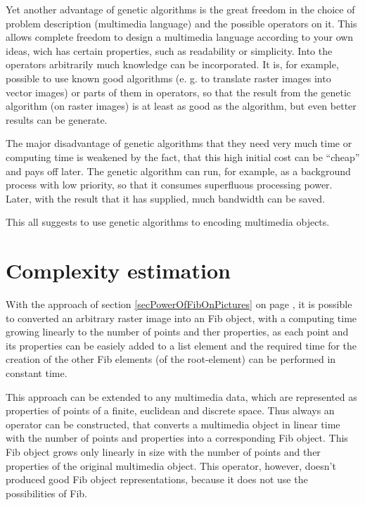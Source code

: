 Yet another advantage of genetic algorithms is the great freedom in the choice of problem description (multimedia language) and the possible operators on it. This allows complete freedom to design a multimedia language according to your own ideas, wich has certain properties, such as readability or simplicity. Into the operators arbitrarily much knowledge can be incorporated. It is, for example, possible to use known good algorithms (e. g. to translate raster images into vector images) or parts of them in operators, so that the result from the genetic algorithm (on raster images) is at least as good as the algorithm, but even better results can be generate.

The major disadvantage of genetic algorithms that they need very much time or computing time is weakened by the fact, that this high initial cost can be ``cheap'' and pays off later. The genetic algorithm can run, for example, as a background process with low priority, so that it consumes superfluous processing power. Later, with the result that it has supplied, much bandwidth can be saved.

This all suggests to use genetic algorithms to encoding multimedia objects.


\section{Complexity estimation}
\label{abschaet}

With the approach of section \ref{secPowerOfFibOnPictures} on page \pageref{secPowerOfFibOnPictures}, it is possible to converted an arbitrary raster image into an Fib object, with a computing time growing linearly to the number of points and ther properties, as each point and its properties can be easiely added to a list element and the required time for the creation of the other Fib elements (of the root-element) can be performed in constant time.

This approach can be extended to any multimedia data, which are represented as properties of points of a finite, euclidean and discrete space. Thus always an operator can be constructed, that converts a multimedia object in linear time with the number of points and properties into a corresponding Fib object. This Fib object grows only linearly in size with the number of points and ther properties of the original multimedia object.
This operator, however, doesn't produced good Fib object representations, because it does not use the possibilities of Fib.

